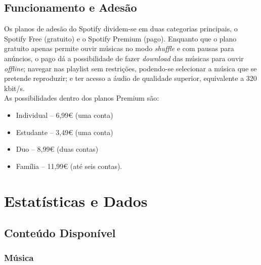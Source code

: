    

\section{Funcionamento e Adesão}
Os planos de adesão do Spotify dividem-se em duas categorias principais, o Spotify Free (gratuito) e o Spotify Premium (pago).
	Enquanto que o plano gratuito apenas permite ouvir músicas no modo \textit{shuffle} e com pausas para anúncios, o pago dá a possibilidade de fazer \textit{download} das músicas para ouvir \textit{offline}; navegar nas playlist sem restrições, podendo-se selecionar a música que se pretende reproduzir; e ter acesso a áudio de qualidade superior, equivalente a 320 kbit/s.\\
	
As possibilidades dentro dos planos Premium são:
	\begin{itemize}
	\item Individual – 6,99€ (uma conta)
	\item Estudante – 3,49€ (uma conta)
	\item Duo – 8,99€ (duas contas)
	\item Família – 11,99€ (até seis contas).
	\end{itemize}
			

\chapter{Estatísticas e Dados}
\label{estaticadados}
\section{Conteúdo Disponível}
\subsection{Música}

